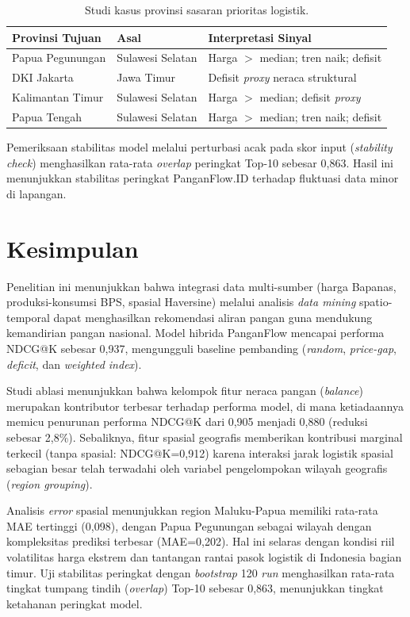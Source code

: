 \documentclass[journal, a4paper]{IEEEtran}
\begin{document}
\begin{table}[H]
  \footnotesize
  \caption{Studi kasus provinsi sasaran prioritas logistik.}
  \label{tab:cases}
  \begin{tabular}{l l p{2.0cm}}
    \toprule
    Provinsi Tujuan & Asal & Interpretasi Sinyal \\
    \midrule
    Papua Pegunungan & Sulawesi Selatan & Harga $>$ median; tren naik; defisit \\
    DKI Jakarta & Jawa Timur & Defisit \textit{proxy} neraca struktural \\
    Kalimantan Timur & Sulawesi Selatan & Harga $>$ median; defisit \textit{proxy} \\
    Papua Tengah & Sulawesi Selatan & Harga $>$ median; tren naik; defisit \\
    \bottomrule
  \end{tabular}
\end{table}

Pemeriksaan stabilitas model melalui perturbasi acak pada skor input (\textit{stability check}) menghasilkan rata-rata \textit{overlap} peringkat Top-10 sebesar 0,863. Hasil ini menunjukkan stabilitas peringkat PanganFlow.ID terhadap fluktuasi data minor di lapangan.



\section{Kesimpulan}
Penelitian ini menunjukkan bahwa integrasi data multi-sumber (harga Bapanas, produksi-konsumsi BPS, spasial Haversine) melalui analisis \textit{data mining} spatio-temporal dapat menghasilkan rekomendasi aliran pangan guna mendukung kemandirian pangan nasional. Model hibrida PanganFlow mencapai performa NDCG@K sebesar 0,937, mengungguli baseline pembanding (\textit{random}, \textit{price-gap}, \textit{deficit}, dan \textit{weighted index}).

Studi ablasi menunjukkan bahwa kelompok fitur neraca pangan (\textit{balance}) merupakan kontributor terbesar terhadap performa model, di mana ketiadaannya memicu penurunan performa NDCG@K dari 0,905 menjadi 0,880 (reduksi sebesar 2,8\%). Sebaliknya, fitur spasial geografis memberikan kontribusi marginal terkecil (tanpa spasial: NDCG@K=0,912) karena interaksi jarak logistik spasial sebagian besar telah terwadahi oleh variabel pengelompokan wilayah geografis (\textit{region grouping}).

Analisis \textit{error} spasial menunjukkan region Maluku-Papua memiliki rata-rata MAE tertinggi (0,098), dengan Papua Pegunungan sebagai wilayah dengan kompleksitas prediksi terbesar (MAE=0,202). Hal ini selaras dengan kondisi riil volatilitas harga ekstrem dan tantangan rantai pasok logistik di Indonesia bagian timur. Uji stabilitas peringkat dengan \textit{bootstrap} 120 \textit{run} menghasilkan rata-rata tingkat tumpang tindih (\textit{overlap}) Top-10 sebesar 0,863, menunjukkan tingkat ketahanan peringkat model.
\end{document}
